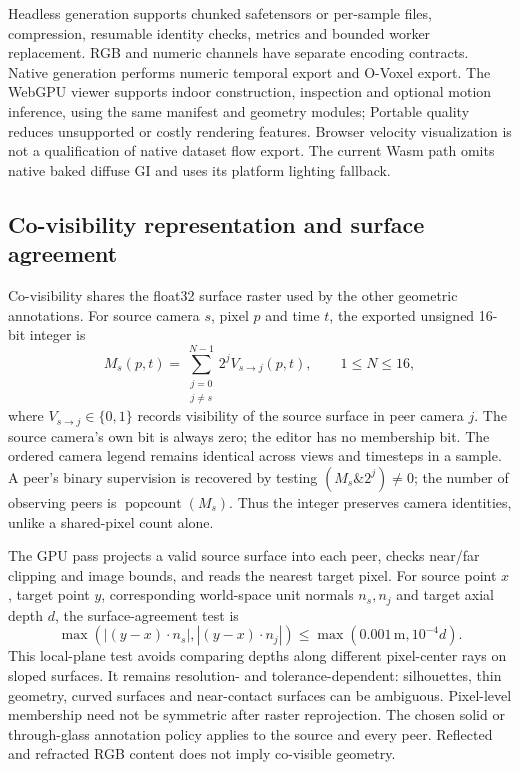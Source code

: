 \documentclass{article}
\begin{document}
Headless generation supports chunked safetensors or per-sample files, compression, resumable identity checks, metrics and bounded worker replacement. RGB and numeric channels have separate encoding contracts. Native generation performs numeric temporal export and O-Voxel export. The WebGPU viewer supports indoor construction, inspection and optional motion inference, using the same manifest and geometry modules; Portable quality reduces unsupported or costly rendering features. Browser velocity visualization is not a qualification of native dataset flow export. The current Wasm path omits native baked diffuse GI and uses its platform lighting fallback.

\subsection{Co-visibility representation and surface agreement}
Co-visibility shares the float32 surface raster used by the other geometric annotations. For source camera $s$, pixel $p$ and time $t$, the exported unsigned 16-bit integer is
\[
 M_s(p,t)=\sum_{\substack{j=0\\j\ne s}}^{N-1}2^j V_{s\rightarrow j}(p,t),
 \qquad 1\leq N\leq16,
\]
where $V_{s\rightarrow j}\in\{0,1\}$ records visibility of the source surface in peer camera $j$. The source camera's own bit is always zero; the editor has no membership bit. The ordered camera legend remains identical across views and timesteps in a sample. A peer's binary supervision is recovered by testing $(M_s\mathbin{\&}2^j)\ne0$; the number of observing peers is $\operatorname{popcount}(M_s)$. Thus the integer preserves camera identities, unlike a shared-pixel count alone.

The GPU pass projects a valid source surface into each peer, checks near/far clipping and image bounds, and reads the nearest target pixel. For source point $x$, target point $y$, corresponding world-space unit normals $n_s,n_j$ and target axial depth $d$, the surface-agreement test is
\[
 \max\!\left(\left|(y-x)\cdot n_s\right|,
                    \left|(y-x)\cdot n_j\right|\right)
 \leq \max(0.001\,\mathrm{m},10^{-4}d).
\]
This local-plane test avoids comparing depths along different pixel-center rays on sloped surfaces. It remains resolution- and tolerance-dependent: silhouettes, thin geometry, curved surfaces and near-contact surfaces can be ambiguous. Pixel-level membership need not be symmetric after raster reprojection. The chosen solid or through-glass annotation policy applies to the source and every peer. Reflected and refracted RGB content does not imply co-visible geometry.
\end{document}
